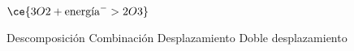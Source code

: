 $\ce{3O2 + \text{energía} ^ -> 2O3}$

\begin{choices}
    \choice Descomposición
    \CorrectChoice Combinación
    \choice Desplazamiento
    \choice Doble desplazamiento
\end{choices}